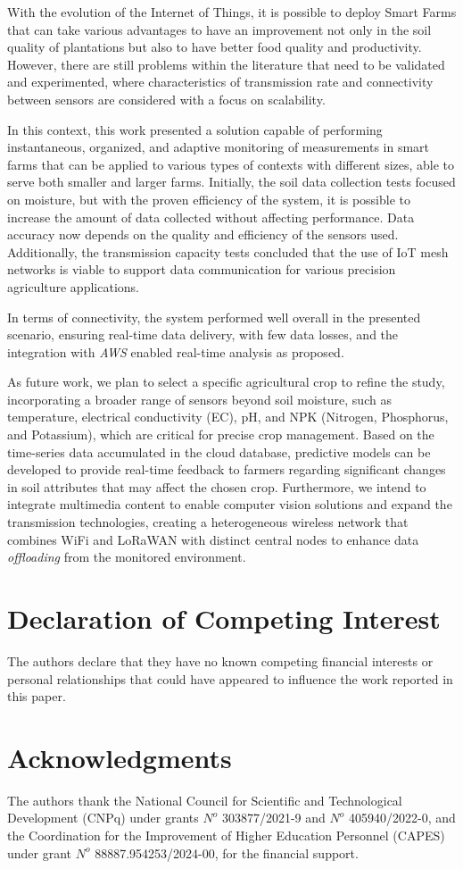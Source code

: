 \documentclass[journal]{IEEEtran}
\begin{document}
With the evolution of the Internet of Things, it is possible to deploy Smart Farms that can take various advantages to have an improvement not only in the soil quality of plantations but also to have better food quality and productivity. However, there are still problems within the literature that need to be validated and experimented, where characteristics of transmission rate and connectivity between sensors are considered with a focus on scalability.

In this context, this work presented a solution capable of performing instantaneous, organized, and adaptive monitoring of measurements in smart farms that can be applied to various types of contexts with different sizes, able to serve both smaller and larger farms. Initially, the soil data collection tests focused on moisture, but with the proven efficiency of the system, it is possible to increase the amount of data collected without affecting performance. Data accuracy now depends on the quality and efficiency of the sensors used. Additionally, the transmission capacity tests concluded that the use of IoT mesh networks is viable to support data communication for various precision agriculture applications.

In terms of connectivity, the system performed well overall in the presented scenario, ensuring real-time data delivery, with few data losses, and the integration with \textit{AWS} enabled real-time analysis as proposed.

As future work, we plan to select a specific agricultural crop to refine the study, incorporating a broader range of sensors beyond soil moisture, such as temperature, electrical conductivity (EC), pH, and NPK (Nitrogen, Phosphorus, and Potassium), which are critical for precise crop management. Based on the time-series data accumulated in the cloud database, predictive models can be developed to provide real-time feedback to farmers regarding significant changes in soil attributes that may affect the chosen crop. Furthermore, we intend to integrate multimedia content to enable computer vision solutions and expand the transmission technologies, creating a heterogeneous wireless network that combines WiFi and LoRaWAN with distinct central nodes to enhance data \textit{offloading} from the monitored environment.

\section*{Declaration of Competing Interest}
The authors declare that they have no known competing financial interests or personal relationships that could have appeared to influence the work reported in this paper.

\section*{Acknowledgments}
The authors thank the National Council for Scientific and Technological Development (CNPq) under grants $N^{o}$ 303877/2021-9 and $N^{o}$ 405940/2022-0, and the Coordination for the Improvement of Higher Education Personnel (CAPES) under grant $N^{o}$ 88887.954253/2024-00, for the financial support.



\end{document}
